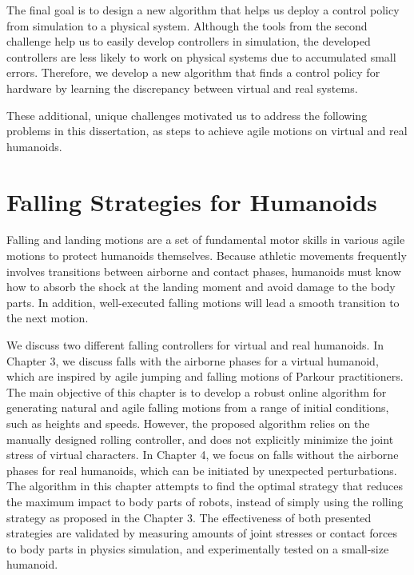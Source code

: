 The final goal is to design a new algorithm that helps us deploy a
  control policy from simulation to a physical system.
  Although the tools from the second challenge help us to easily develop
  controllers in simulation, the developed controllers are less likely to work
  on physical systems due to accumulated small errors.
  Therefore, we develop a new algorithm that finds a control policy for
  hardware by learning the discrepancy between virtual and real systems.


These additional, unique challenges motivated us to address the following 
problems in this dissertation, as steps to achieve agile motions 
on virtual and real humanoids.

\section{Falling Strategies for Humanoids}
Falling and landing motions are a set of fundamental motor skills
in various agile motions to protect humanoids themselves.
Because athletic movements frequently involves
transitions between airborne and contact phases, humanoids must know
how to absorb the shock at the landing moment and avoid damage to the body
parts. 
In addition, well-executed falling motions will lead a smooth transition to the
next motion.

We discuss two different falling controllers for virtual and real
humanoids. 
In Chapter 3, we discuss falls with the airborne phases for a virtual
  humanoid, which are inspired by agile jumping and falling motions of Parkour
  practitioners. 
  The main objective of this chapter is to develop a robust online algorithm
  for generating natural and agile falling motions from a range of initial
  conditions, such as heights and speeds.
  However, the proposed algorithm relies on the manually designed rolling
  controller, and does not explicitly minimize the joint stress of virtual
  characters.  
  In Chapter 4, we focus on falls without the airborne
  phases for real humanoids, which can be initiated by unexpected perturbations.
  The algorithm in this chapter attempts to find the optimal strategy
  that reduces the maximum impact to body parts of robots, instead of simply
  using the rolling strategy as proposed in the Chapter 3.
The effectiveness of both presented strategies are validated by measuring
amounts of joint stresses or contact forces to body parts in physics
simulation, and experimentally tested on a small-size humanoid.

